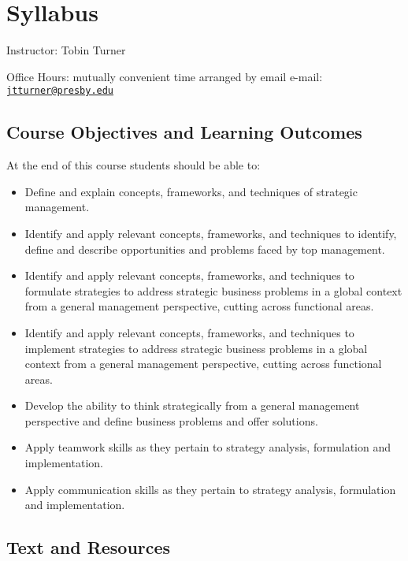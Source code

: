 \documentclass[
]{book}
\providecommand{\tightlist}{%
  \setlength{\itemsep}{0pt}\setlength{\parskip}{0pt}}
\begin{document}
\hypertarget{syllabus}{%
\chapter{Syllabus}\label{syllabus}}

Instructor: Tobin Turner

Office Hours: mutually convenient time arranged by email e-mail: \href{mailto:jtturner@presby.edu}{\nolinkurl{jtturner@presby.edu}}

\hypertarget{course-objectives-and-learning-outcomes}{%
\section{Course Objectives and Learning Outcomes}\label{course-objectives-and-learning-outcomes}}

At the end of this course students should be able to:

\begin{itemize}
\tightlist
\item
  Define and explain concepts, frameworks, and techniques of strategic management.
\item
  Identify and apply relevant concepts, frameworks, and techniques to identify, define and describe opportunities and problems faced by top management.
\item
  Identify and apply relevant concepts, frameworks, and techniques to formulate strategies to address strategic business problems in a global context from a general management perspective, cutting across functional areas.
\item
  Identify and apply relevant concepts, frameworks, and techniques to implement strategies to address strategic business problems in a global context from a general management perspective, cutting across functional areas.
\item
  Develop the ability to think strategically from a general management perspective and define business problems and offer solutions.
\item
  Apply teamwork skills as they pertain to strategy analysis, formulation and implementation.
\item
  Apply communication skills as they pertain to strategy analysis, formulation and implementation.
\end{itemize}

\hypertarget{text-and-resources}{%
\section{Text and Resources}\label{text-and-resources}}
\end{document}
